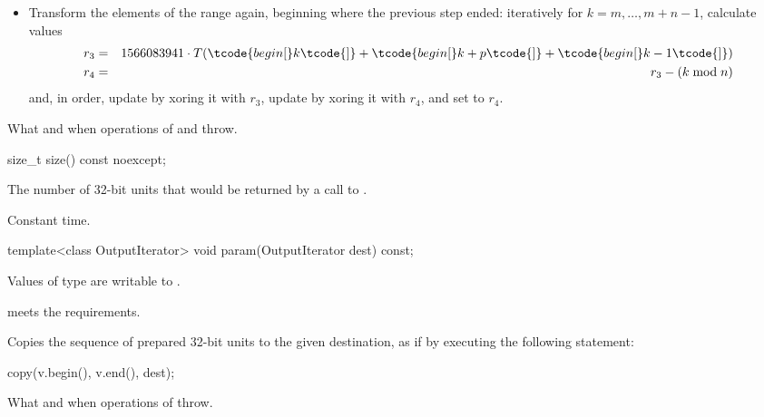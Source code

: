 \begin{itemdescr}
\begin{itemize}
\begin{eqnarray*}
     \right.
   \end{eqnarray*}
   and, in order,
   increment  by $r_1$,
   increment  by $r_2$,
   and
   set  to $r_2$.
 \item
   Transform the elements of the range again,
   beginning where the previous step ended:
   iteratively for $k = m, \dotsc, m + n - 1$,
   calculate values
   \begin{eqnarray*}
     r_3 & = &
       1566083941 \cdot T( \tcode{begin[}k  \tcode{]}
                         + \tcode{begin[}k+p\tcode{]}
                         + \tcode{begin[}k-1\tcode{]}
                         )
     \\
     r_4 & = & r_3 - (k \bmod n)
   \end{eqnarray*}
   and, in order,
   \noindent
   update  by xoring it with $r_3$,
   update  by xoring it with $r_4$,
   and
   set  to $r_4$.
\end{itemize}

\pnum
\throws
What and when  operations of 
and  throw.
\end{itemdescr}

%
\begin{itemdecl}
size_t size() const noexcept;
\end{itemdecl}

\begin{itemdescr}
\pnum
\returns
The number of 32-bit units
 that would be returned
 by a call to .

\pnum
\complexity
Constant time.
\end{itemdescr}

%
\begin{itemdecl}
template<class OutputIterator>
  void param(OutputIterator dest) const;
\end{itemdecl}

\begin{itemdescr}
\pnum
\mandates
  Values of type  are writable to .

\pnum
\expects
   meets the
   requirements.

\pnum
\effects
Copies the sequence of prepared 32-bit units
 to the given destination,
 as if by executing the following statement:
\begin{codeblock}
copy(v.begin(), v.end(), dest);
\end{codeblock}

\pnum
\throws
What and when  operations of  throw.
\end{itemdescr}

